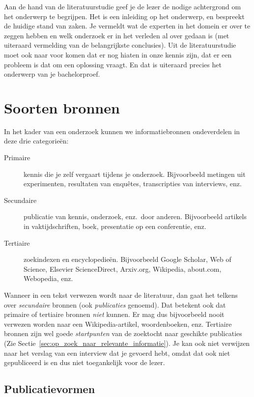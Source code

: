 Aan de hand van de literatuurstudie geef je de lezer de nodige achtergrond om het onderwerp te begrijpen. Het is een inleiding op het onderwerp, en bespreekt de huidige stand van zaken. Je vermeldt wat de experten in het domein er over te zeggen hebben en welk onderzoek er in het verleden al over gedaan is (met uiteraard vermelding van de belangrijkste conclusies). Uit de literatuurstudie moet ook naar voor komen dat er nog hiaten in onze kennis zijn, dat er een probleem is dat om een oplossing vraagt. En dat is uiteraard precies het onderwerp van je bachelorproef.

\section{Soorten bronnen}
\label{sec:soorten-bronnen}

In het kader van een onderzoek kunnen we informatiebronnen ondeverdelen in deze drie categorieën:

\begin{description}
  \item[Primaire] kennis die je zelf vergaart tijdens je onderzoek. Bijvoorbeeld metingen uit experimenten, resultaten van enquêtes, transcripties van interviews, enz.
  \item[Secundaire] publicatie van kennis, onderzoek, enz.~door anderen. Bijvoorbeeld artikels in vaktijdschriften, boek, presentatie op een conferentie, enz.
  \item[Tertiaire] zoekindexen en encyclopedieën. Bijvoorbeeld Google Scholar, Web of Science, Elsevier ScienceDirect, Arxiv.org, Wikipedia, about.com, Webopedia, enz.
\end{description}

Wanneer in een tekst verwezen wordt naar de literatuur, dan gaat het telkens over \emph{secundaire} bronnen (ook \emph{publicaties} genoemd). Dat betekent ook dat primaire of tertiaire bronnen \emph{niet} kunnen. Er mag dus bijvoorbeeld nooit verwezen worden naar een Wikipedia-artikel, woordenboeken, enz. Tertiaire bronnen zijn wel goede \textit{startpunten} van de zoektocht naar geschikte publicaties (Zie Sectie~\ref{sec:op_zoek_naar_relevante_informatie}). Je kan ook niet verwijzen naar het verslag van een interview dat je gevoerd hebt, omdat dat ook niet gepubliceerd is en dus niet toegankelijk voor de lezer.

\subsection{Publicatievormen}
\label{sub:publicatievormen}

